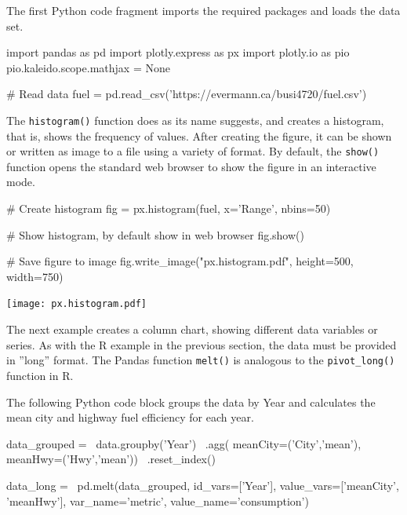 The first Python code fragment imports the required packages and loads the data set. 

\begin{samepage}
\begin{pythoncode}
import pandas as pd
import plotly.express as px
import plotly.io as pio
pio.kaleido.scope.mathjax = None

# Read data
fuel = pd.read_csv('https://evermann.ca/busi4720/fuel.csv')
\end{pythoncode}
\end{samepage}

\noindent The \texttt{histogram()} function does as its name suggests, and creates a histogram, that is, shows the frequency of values. After creating the figure, it can be shown or written as image to a file using a variety of format. By default, the \texttt{show()} function opens the standard web browser to show the figure in an interactive mode.

\begin{samepage}
\begin{pythoncode}
# Create histogram
fig = px.histogram(fuel, x='Range', nbins=50)

# Show histogram, by default show in web browser
fig.show()

# Save figure to image
fig.write_image("px.histogram.pdf", height=500, width=750)
\end{pythoncode}
\end{samepage}

\begin{center}
    \texttt{[image: px.histogram.pdf]}
\end{center}

The next example creates a column chart, showing different data variables or series. As with the R example in the previous section, the data must be provided in ''long'' format. The Pandas function \texttt{melt()} is analogous to the \texttt{pivot\_long()} function in R.

The following Python code block groups the data by Year and calculates the mean city and highway fuel efficiency for each year. 

\begin{samepage}
\begin{pythoncode}
data_grouped = \
    data.groupby('Year') \
        .agg(
             meanCity=('City','mean'),
             meanHwy=('Hwy','mean')) \
        .reset_index()

data_long = \
    pd.melt(data_grouped, 
            id_vars=['Year'], 
            value_vars=['meanCity', 'meanHwy'], 
            var_name='metric', 
            value_name='consumption')
\end{pythoncode}
\end{samepage}


